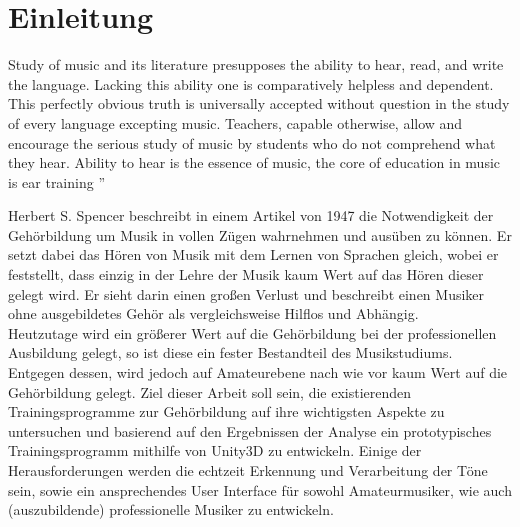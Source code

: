 \begin{abstract}
    
\end{abstract}



\chapter{Einleitung}
\glqq 
Study of music and
its literature presupposes the ability to hear,
read, and write the language. Lacking this ability one is
comparatively helpless and dependent. This perfectly
obvious truth is universally accepted without question
in the study of every language excepting music. Teachers, capable otherwise, allow and encourage the serious
study of music by students who do not comprehend what
they hear. Ability to hear is the essence of music, the
core of education in music is ear training
''  \cite{spencer1947ear}

Herbert S. Spencer beschreibt in einem Artikel von 1947 die Notwendigkeit der Gehörbildung um Musik in vollen Zügen wahrnehmen und ausüben zu können. Er setzt dabei das Hören von Musik mit dem Lernen von Sprachen gleich, wobei er feststellt, dass einzig in der Lehre der Musik kaum Wert auf das Hören dieser gelegt wird. Er sieht darin einen großen Verlust und beschreibt einen Musiker ohne ausgebildetes Gehör als vergleichsweise Hilflos und Abhängig. \\
Heutzutage wird ein größerer Wert auf die Gehörbildung bei der professionellen Ausbildung gelegt, so ist diese ein fester Bestandteil des Musikstudiums. Entgegen dessen, wird jedoch auf Amateurebene nach wie vor kaum Wert auf die Gehörbildung gelegt. Ziel dieser Arbeit soll sein, die existierenden Trainingsprogramme zur Gehörbildung auf ihre wichtigsten Aspekte zu untersuchen und basierend auf den Ergebnissen der Analyse ein prototypisches Trainingsprogramm mithilfe von Unity3D zu entwickeln. Einige der Herausforderungen werden die echtzeit Erkennung und Verarbeitung der Töne sein, sowie ein ansprechendes User Interface für sowohl Amateurmusiker, wie auch (auszubildende) professionelle Musiker zu entwickeln. 




